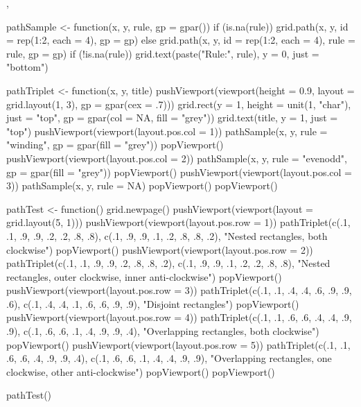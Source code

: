 %
\begin{SeeAlso}\relax
{},
\end{SeeAlso}
%
\begin{Examples}
\begin{ExampleCode}
pathSample <- function(x, y, rule, gp = gpar()) {
    if (is.na(rule))
        grid.path(x, y, id = rep(1:2, each = 4), gp = gp)
    else 
        grid.path(x, y, id = rep(1:2, each = 4), rule = rule, gp = gp)
    if (!is.na(rule))
        grid.text(paste("Rule:", rule), y = 0, just = "bottom")
}

pathTriplet <- function(x, y, title) {
    pushViewport(viewport(height = 0.9, layout = grid.layout(1, 3),
                          gp = gpar(cex = .7)))
    grid.rect(y = 1, height = unit(1, "char"), just = "top",
              gp = gpar(col = NA, fill = "grey"))
    grid.text(title, y = 1, just = "top")
    pushViewport(viewport(layout.pos.col = 1))
    pathSample(x, y, rule = "winding",
               gp = gpar(fill = "grey"))
    popViewport()
    pushViewport(viewport(layout.pos.col = 2))
    pathSample(x, y, rule = "evenodd",
               gp = gpar(fill = "grey"))
    popViewport()
    pushViewport(viewport(layout.pos.col = 3))
    pathSample(x, y, rule = NA)
    popViewport()
    popViewport()
}

pathTest <- function() {
    grid.newpage()
    pushViewport(viewport(layout = grid.layout(5, 1)))
    pushViewport(viewport(layout.pos.row = 1))
    pathTriplet(c(.1, .1, .9, .9, .2, .2, .8, .8),
                c(.1, .9, .9, .1, .2, .8, .8, .2),
                "Nested rectangles, both clockwise")
    popViewport()
    pushViewport(viewport(layout.pos.row = 2))
    pathTriplet(c(.1, .1, .9, .9, .2, .8, .8, .2),
                c(.1, .9, .9, .1, .2, .2, .8, .8),
                "Nested rectangles, outer clockwise, inner anti-clockwise")
    popViewport()
    pushViewport(viewport(layout.pos.row = 3))
    pathTriplet(c(.1, .1, .4, .4, .6, .9, .9, .6),
                c(.1, .4, .4, .1, .6, .6, .9, .9),
                "Disjoint rectangles")
    popViewport()
    pushViewport(viewport(layout.pos.row = 4))
    pathTriplet(c(.1, .1, .6, .6, .4, .4, .9, .9),
                c(.1, .6, .6, .1, .4, .9, .9, .4),
                "Overlapping rectangles, both clockwise")
    popViewport()
    pushViewport(viewport(layout.pos.row = 5))
    pathTriplet(c(.1, .1, .6, .6, .4, .9, .9, .4),
                c(.1, .6, .6, .1, .4, .4, .9, .9),
                "Overlapping rectangles, one clockwise, other anti-clockwise")
    popViewport()
    popViewport()
}

pathTest()
\end{ExampleCode}
\end{Examples}
